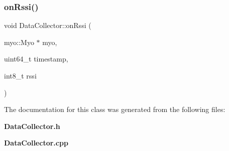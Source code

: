 \mbox{\label{class_data_collector_aff0d95e10b014c460bf859abd6a01f74}} 
\subsubsection{on\+Rssi()}
{\footnotesize\ttfamily void Data\+Collector\+::on\+Rssi (\begin{DoxyParamCaption}\item[{myo\+::\+Myo $\ast$}]{myo,  }\item[{uint64\+\_\+t}]{timestamp,  }\item[{int8\+\_\+t}]{rssi }\end{DoxyParamCaption})}



The documentation for this class was generated from the following files\+:\begin{DoxyCompactItemize}
\item 
\textbf{ Data\+Collector.\+h}\item 
\textbf{ Data\+Collector.\+cpp}\end{DoxyCompactItemize}
